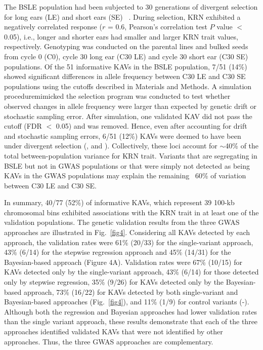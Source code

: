 \documentclass[10pt,letterpaper]{article}
\begin{document}
The BSLE population had been subjected to 30 generations of divergent selection for long ears (LE) and short ears (SE) ~\cite{Hallauer2004}. During selection, KRN exhibited a negatively correlated response ($r$ = 0.6, Pearson’s correlation test $P$ value $<$ 0.05), i.e., longer and shorter ears had smaller and larger KRN trait values, respectively. Genotyping was conducted on the parental lines and bulked seeds from cycle 0 (C0), cycle 30 long ear (C30 LE) and cycle 30 short ear (C30 SE) populations. Of the 51 informative KAVs in the BSLE population, 7/51 (14\%) showed significant differences in allele frequency between C30 LE and C30 SE populations using the cutoffs described in Materials and Methods. 
A simulation procedure\DIFdelbegin {}\DIFdelend \DIFaddbegin {}\DIFaddend mimicked the selection program was conducted to test whether observed changes in allele frequency were larger than expected by genetic drift or stochastic sampling error.
After simulation, one validated KAV did not pass the cutoff (FDR $<$ 0.05) and was removed. Hence, even after accounting for drift and stochastic sampling errors, 6/51 (12\%) KAVs were deemed to have been under divergent selection (,  and ). Collectively, these loci account for $\sim$40\% of the total between-population variance for KRN trait. Variants that are segregating in BSLE but not in GWAS populations or that were simply not detected as being KAVs in the GWAS populations may explain the remaining ~60\% of variation between C30 LE and C30 SE.

In summary, 40/77 (52\%) of informative KAVs, which represent 39 100-kb chromosomal bins exhibited associations with the KRN trait in at least one of the validation populations. The genetic validation results from the three GWAS approaches are illustrated in Fig.~\ref{fig4}. Considering all KAVs detected by each approach, the validation rates were 61\% (20/33) for the single-variant approach, 43\% (6/14) for the stepwise regression approach and 45\% (14/31) for the Bayesian-based approach (Figure 4A). Validation rates were 67\% (10/15) for KAVs detected only by the single-variant approach, 43\% (6/14) for those detected only by stepwise regression, 35\% (9/26) for KAVs detected only by the Bayesian-based approach, 73\% (16/22) for KAVs detected by both single-variant and Bayesian-based approaches (Fig.~\ref{fig4}), and 11\% (1/9) for control variants (-). Although both the regression and Bayesian approaches had lower validation rates than the single variant approach, these results demonstrate that each of the three approaches identified validated KAVs that were not identified by other approaches. Thus, the three GWAS approaches are complementary. 
\end{document}
